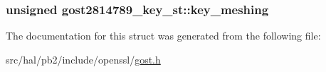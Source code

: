 \subsubsection[{\texorpdfstring{key\+\_\+meshing}{key_meshing}}]{\setlength{\rightskip}{0pt plus 5cm}unsigned gost2814789\+\_\+key\+\_\+st\+::key\+\_\+meshing}\hypertarget{structgost2814789__key__st_a50c93063f2aa8a02401aada39c206398}{}\label{structgost2814789__key__st_a50c93063f2aa8a02401aada39c206398}


The documentation for this struct was generated from the following file\+:\begin{DoxyCompactItemize}
\item 
src/hal/pb2/include/openssl/\hyperlink{gost_8h}{gost.\+h}\end{DoxyCompactItemize}
